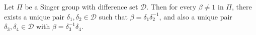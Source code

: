 Let $\Pi$ be a Singer group with difference set $\mathcal{D}$. Then for every $\beta \neq 1$ in $\Pi$, there exists a unique pair $\delta_1, \delta_2 \in \mathcal{D}$ such that $\beta = \delta_1 \delta_2^{-1}$, and also a unique pair $\delta_3, \delta_4 \in \mathcal{D}$ with $\beta = \delta_3^{-1} \delta_4$.
